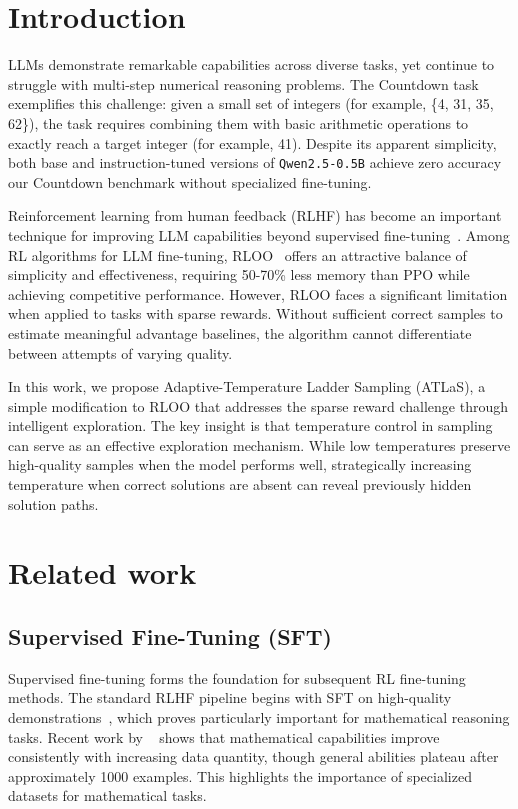 \documentclass{article}
\begin{document}
\section{Introduction}
LLMs demonstrate remarkable capabilities across diverse tasks, yet continue to struggle with multi-step numerical reasoning problems. The Countdown task exemplifies this challenge: given a small set of integers (for example, \{4, 31, 35, 62\}), the task requires combining them with basic arithmetic operations to exactly reach a target integer (for example, 41). Despite its apparent simplicity, both base and instruction-tuned versions of \texttt{Qwen2.5-0.5B} achieve zero accuracy our Countdown benchmark without specialized fine-tuning.

Reinforcement learning from human feedback (RLHF) has become an important technique for improving LLM capabilities beyond supervised fine-tuning~\cite{ouyang2022training}. Among RL algorithms for LLM fine-tuning, RLOO~\cite{ahmadian2024back} offers an attractive balance of simplicity and effectiveness, requiring 50-70\% less memory than PPO while achieving competitive performance. However, RLOO faces a significant limitation when applied to tasks with sparse rewards. Without sufficient correct samples to estimate meaningful advantage baselines, the algorithm cannot differentiate between attempts of varying quality.

In this work, we propose Adaptive-Temperature Ladder Sampling (ATLaS), a simple modification to RLOO that addresses the sparse reward challenge through intelligent exploration. The key insight is that temperature control in sampling can serve as an effective exploration mechanism. While low temperatures preserve high-quality samples when the model performs well, strategically increasing temperature when correct solutions are absent can reveal previously hidden solution paths.

\section{Related work}

\subsection{Supervised Fine-Tuning (SFT)}

Supervised fine-tuning forms the foundation for subsequent RL fine-tuning methods. The standard RLHF pipeline begins with SFT on high-quality demonstrations~\cite{ouyang2022training}, which proves particularly important for mathematical reasoning tasks. Recent work by ~\cite{dong2023abilities} shows that mathematical capabilities improve consistently with increasing data quantity, though general abilities plateau after approximately 1000 examples. This highlights the importance of specialized datasets for mathematical tasks.
\end{document}
